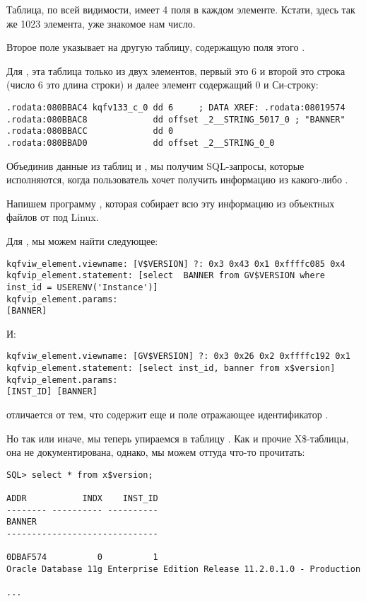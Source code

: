 Таблица, по всей видимости, имеет 4 поля в каждом элементе. Кстати, здесь так же 1023 элемента, уже знакомое нам число.

Второе поле указывает на другую таблицу, содержащую поля этого .

Для , эта таблица только из двух элементов, первый это 6 и второй это строка 
 (число 6 это длина строки) и далее  элемент содержащий 0 и  
Си-строку:

\begin{lstlisting}[caption=kqf.o]
.rodata:080BBAC4 kqfv133_c_0 dd 6     ; DATA XREF: .rodata:08019574
.rodata:080BBAC8             dd offset _2__STRING_5017_0 ; "BANNER"
.rodata:080BBACC             dd 0
.rodata:080BBAD0             dd offset _2__STRING_0_0
\end{lstlisting}

Объединив данные из таблиц  и , мы получим SQL-запросы, которые исполняются, когда пользователь хочет получить информацию из какого-либо .

Напишем программу \oracletables, которая собирает всю эту информацию из объектных файлов от \oracle под Linux.

Для , мы можем найти следующее:

\begin{lstlisting}[caption=Результат работы \OracleTablesName]
kqfviw_element.viewname: [V$VERSION] ?: 0x3 0x43 0x1 0xffffc085 0x4
kqfvip_element.statement: [select  BANNER from GV$VERSION where inst_id = USERENV('Instance')]
kqfvip_element.params:
[BANNER] 
\end{lstlisting}

И:

\begin{lstlisting}[caption=Результат работы \OracleTablesName]
kqfviw_element.viewname: [GV$VERSION] ?: 0x3 0x26 0x2 0xffffc192 0x1
kqfvip_element.statement: [select inst_id, banner from x$version]
kqfvip_element.params:
[INST_ID] [BANNER] 
\end{lstlisting}

  отличается от  тем, что содержит еще и поле отражающее идентификатор .

Но так или иначе, мы теперь упираемся в таблицу . Как и прочие X\$-таблицы, она не документирована, однако, мы можем оттуда что-то прочитать:

\begin{lstlisting}
SQL> select * from x$version;

ADDR           INDX    INST_ID
-------- ---------- ----------
BANNER
------------------------------

0DBAF574          0          1
Oracle Database 11g Enterprise Edition Release 11.2.0.1.0 - Production

...
\end{lstlisting}

